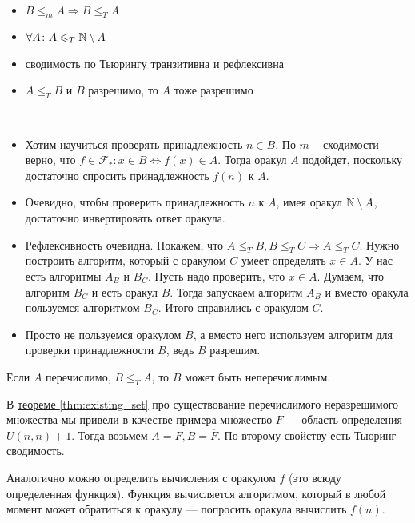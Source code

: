 \begin{prop}
	~\begin{itemize}
		\item $ B \le _{m} A \Longrightarrow B \le _T A$
		\item $ \forall A\colon  A \leqslant _{T} \mathbb{N} \setminus A $
		\item сводимость по Тьюрингу транзитивна и рефлексивна
		\item $ A \le _{T} B $ и $ B$ разрешимо, то $ A$ тоже разрешимо
    \end{itemize}
\end{prop}
\begin{proof*}
    ~\begin{itemize}
        \item Хотим научиться проверять принадлежность $n \in B$. По $m-$сходимости верно, что $f \in \mathcal{F}_{*}: x \in B \Leftrightarrow f(x) \in A$. Тогда оракул $A$ подойдет, поскольку достаточно спросить принадлежность $f(n)$ к $A$.
        \item Очевидно, чтобы проверить принадлежность $n$ к $A$, имея оракул $\mathbb{N} \setminus A$, достаточно инвертировать ответ оракула.
        \item Рефлексивность очевидна. Покажем, что $A \le_{T} B, B \le_{T} C \Rightarrow A \le_{T} C$. Нужно построить алгоритм, который с оракулом $C$ умеет определять $x \in A$. У нас есть алгоритмы $A_B$ и $B_C$. Пусть надо проверить, что $x \in A$. Думаем, что алгоритм $B_C$ и есть оракул $B$. Тогда запускаем алгоритм $A_B$ и вместо оракула пользуемся алгоритмом $B_C$. Итого справились с оракулом $C$.
        \item Просто не пользуемся оракулом $B$, а вместо него используем алгоритм для проверки принадлежности $B$, ведь $B$ разрешим. 
    \end{itemize}
\end{proof*}
\begin{note}
	Если $ A$ перечислимо, $ B \le _{T} A$, то $ B$ может быть неперечислимым.
\end{note}
\begin{proof*}  
 В \hyperref[thm:existing_set]{теореме \ref{thm:existing_set}} про существование перечислимого неразрешимого множества мы привели в качестве примера множество $F$ --- область определения $U(n,n) + 1$. Тогда возьмем $A = F, B = \overline{F}$. По второму свойству есть Тьюринг сводимость. 
\end{proof*}


\begin{defn}
	Аналогично можно определить вычисления с оракулом $ f$ (это всюду определенная функция).
	Функция вычисляется алгоритмом, который в любой момент может обратиться к оракулу ---  попросить оракула вычислить $ f(n)$.
\end{defn}
